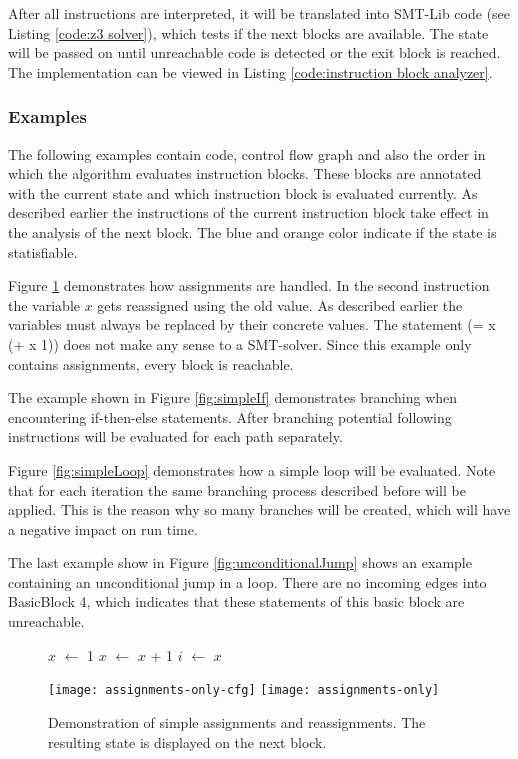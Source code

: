 After all instructions are interpreted, it will be translated into SMT-Lib code (see Listing \ref{code:z3 solver}), which tests if the next blocks are available. 
The state will be passed on until unreachable code is detected or the exit block is reached.
The implementation can be viewed in Listing \ref{code:instruction block analyzer}. 

\subsubsection{Examples}
The following examples contain code, control flow graph and also the order in which the algorithm evaluates instruction blocks. These blocks are annotated with the current state and which instruction block is evaluated currently. As described earlier the instructions of the current instruction block take effect in the analysis of the next block. The blue and orange color indicate if the state is statisfiable.


Figure \ref{fig:assignmentOnly} demonstrates how assignments are handled. In the second instruction the variable $x$ gets reassigned using the old value.
As described earlier the variables must always be replaced by their concrete values. The statement (= x (+ x 1)) does not make any sense to a SMT-solver. 
Since this example only contains assignments, every block is reachable.


The example shown in Figure \ref{fig:simpleIf} demonstrates branching when encountering if-then-else statements. After branching potential following instructions will be evaluated for each path separately. 


Figure \ref{fig:simpleLoop} demonstrates how a simple loop will be evaluated. Note that for each iteration the same branching process described before will be applied. 
This is the reason why so many branches will be created, which will have a negative impact on run time.


The last example show in Figure \ref{fig:unconditionalJump} shows an example containing an unconditional jump in a loop. There are no incoming edges into BasicBlock 4, which indicates that these statements of this basic block are unreachable.

\begin{figure}
	\begin{GenericCode}
$x$ $\leftarrow$ 1
$x$ $\leftarrow$ $x$ + 1
$i$ $\leftarrow$ $x$\end{GenericCode}
	\centering
	\texttt{[image: assignments-only-cfg]}
	\texttt{[image: assignments-only]}
	\caption{Demonstration of simple assignments and reassignments. The resulting state is displayed on the next block.}
	\label{fig:assignmentOnly}
\end{figure}

